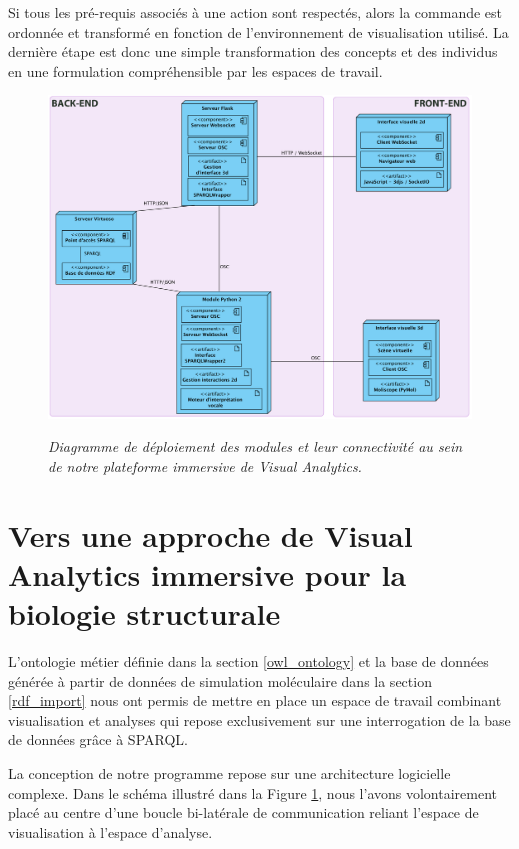 Si tous les pré-requis associés à une action sont respectés, alors la commande est ordonnée et transformé en fonction de l'environnement de visualisation utilisé. La dernière étape est donc une simple transformation des concepts et des individus en une formulation compréhensible par les espaces de travail.

\begin{figure}[htb]
  \centering
  {\includegraphics[width=.95\linewidth]{./figures/ch5/platform_architecture_def}}
    \caption[Diagramme de déploiement de notre plateforme de \textit{Visual Analytics} immersive.]{{\it Diagramme de déploiement des modules et leur connectivité au sein de notre plateforme immersive de Visual Analytics.}}
  \label{Fig:platform_architecture}
  \hspace{0.3cm}
\end{figure}


\section{Vers une approche de Visual Analytics immersive pour la biologie structurale}

L'ontologie métier définie dans la section \ref{owl_ontology} et la base de données générée à partir de données de simulation moléculaire dans la section \ref{rdf_import} nous ont permis de mettre en place un espace de travail combinant visualisation et analyses qui repose exclusivement sur une interrogation de la base de données grâce à SPARQL.

La conception de notre programme repose sur une architecture logicielle complexe. Dans le schéma illustré dans la Figure \ref{Fig:platform_architecture}, nous l'avons volontairement placé au centre d'une boucle bi-latérale de communication reliant l'espace de visualisation à l'espace d'analyse.

